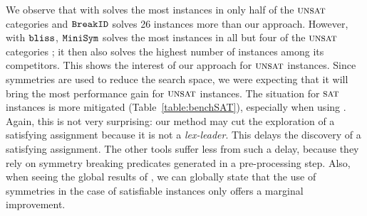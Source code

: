 We observe that \cdclsym{} with \saucy{} solves the most instances in only half
of the $\textsc{unsat}$ categories and $\texttt{BreakID}$ solves 26 instances more than our approach.
 However, with $\texttt{bliss}{}$,  $\texttt{MiniSym}{}$ solves the most
instances in all but four of the $\textsc{unsat}$ categories ; it then also solves the
highest number of instances among its competitors.
This shows the interest
of our approach for $\textsc{unsat}$ instances. Since symmetries are used to reduce the
search space, we were expecting that it will bring the most performance gain
for $\textsc{unsat}$ instances.
The situation for $\textsc{sat}$ instances is more mitigated (Table~\ref{table:benchSAT}),
especially when using \saucy{}. Again, this is not very surprising: our method
may cut the exploration of a satisfying assignment because it is not a
\textit{lex-leader}. This delays the discovery of a satisfying assignment. The
other tools suffer less from such a delay, because they rely on symmetry
breaking predicates generated in a pre-processing step. Also, when seeing the
global results of \minisat{}, we can globally state that the use of symmetries
in the case of satisfiable instances only offers a marginal improvement.

